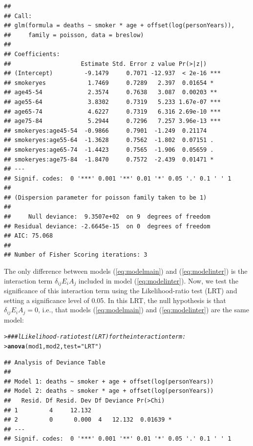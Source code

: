 \documentclass[a4paper,10pt]{article}\usepackage[]{graphicx}\usepackage[]{xcolor}
\makeatletter
\newcommand{\hlsng}[1]{\textcolor[rgb]{0.192,0.494,0.8}{#1}}%
\newcommand{\hlcom}[1]{\textcolor[rgb]{0.678,0.584,0.686}{\textit{#1}}}%
\newcommand{\hldef}[1]{\textcolor[rgb]{0.345,0.345,0.345}{#1}}%
\newcommand{\hlkwc}[1]{\textcolor[rgb]{0.333,0.667,0.333}{#1}}%
\newcommand{\hlkwd}[1]{\textcolor[rgb]{0.737,0.353,0.396}{\textbf{#1}}}%
\newenvironment{kframe}{%
 \def\at@end@of@kframe{}%
 \ifinner\ifhmode%
  \def\at@end@of@kframe{\end{minipage}}%
  \begin{minipage}{\columnwidth}%
 \fi\fi%
 \def\FrameCommand##1{\hskip\@totalleftmargin \hskip-\fboxsep
 \colorbox{shadecolor}{##1}\hskip-\fboxsep
     \hskip-\linewidth \hskip-\@totalleftmargin \hskip\columnwidth}%
 \MakeFramed {\advance\hsize-\width
   \@totalleftmargin\z@ \linewidth\hsize
   \@setminipage}}%
 {\par\unskip\endMakeFramed%
 \at@end@of@kframe}
\newenvironment{knitrout}{}{} %
\makeatother
\begin{document}
\begin{enumerate}
\begin{knitrout}
\begin{kframe}
\begin{verbatim}
## 
## Call:
## glm(formula = deaths ~ smoker * age + offset(log(personYears)), 
##     family = poisson, data = breslow)
## 
## Coefficients:
##                    Estimate Std. Error z value Pr(>|z|)    
## (Intercept)         -9.1479     0.7071 -12.937  < 2e-16 ***
## smokeryes            1.7469     0.7289   2.397  0.01654 *  
## age45-54             2.3574     0.7638   3.087  0.00203 ** 
## age55-64             3.8302     0.7319   5.233 1.67e-07 ***
## age65-74             4.6227     0.7319   6.316 2.69e-10 ***
## age75-84             5.2944     0.7296   7.257 3.96e-13 ***
## smokeryes:age45-54  -0.9866     0.7901  -1.249  0.21174    
## smokeryes:age55-64  -1.3628     0.7562  -1.802  0.07151 .  
## smokeryes:age65-74  -1.4423     0.7565  -1.906  0.05659 .  
## smokeryes:age75-84  -1.8470     0.7572  -2.439  0.01471 *  
## ---
## Signif. codes:  0 '***' 0.001 '**' 0.01 '*' 0.05 '.' 0.1 ' ' 1
## 
## (Dispersion parameter for poisson family taken to be 1)
## 
##     Null deviance:  9.3507e+02  on 9  degrees of freedom
## Residual deviance: -2.6645e-15  on 0  degrees of freedom
## AIC: 75.068
## 
## Number of Fisher Scoring iterations: 3
\end{verbatim}
\end{kframe}
\end{knitrout}


The only difference between models (\ref{eq:modelmain}) and (\ref{eq:modelinter}) is the interaction term $\delta_{ij}E_{i}A_{j}$ included in model (\ref{eq:modelinter}). Now, we test the significance of this interaction term using the Likelihood-ratio test (LRT) and setting a significance level of 0.05. In this LRT, the null hypothesis is that $\delta_{ij}E_{i}A_{j}=0$, i.e., that models (\ref{eq:modelmain}) and (\ref{eq:modelinter}) are the same model:

\begin{knitrout}\footnotesize
{}\color{fgcolor}\begin{kframe}
\begin{alltt}
\hldef{> }\hlcom{### lLikelihood-ratio test (LRT) for the interaction term:}
\hldef{> }\hlkwd{anova}\hldef{(mod1, mod2,} \hlkwc{test} \hldef{=} \hlsng{"LRT"}\hldef{)}
\end{alltt}
\begin{verbatim}
## Analysis of Deviance Table
## 
## Model 1: deaths ~ smoker + age + offset(log(personYears))
## Model 2: deaths ~ smoker * age + offset(log(personYears))
##   Resid. Df Resid. Dev Df Deviance Pr(>Chi)  
## 1         4     12.132                       
## 2         0      0.000  4   12.132  0.01639 *
## ---
## Signif. codes:  0 '***' 0.001 '**' 0.01 '*' 0.05 '.' 0.1 ' ' 1
\end{verbatim}
\end{kframe}
\end{knitrout}


\end{enumerate}
\end{document}
